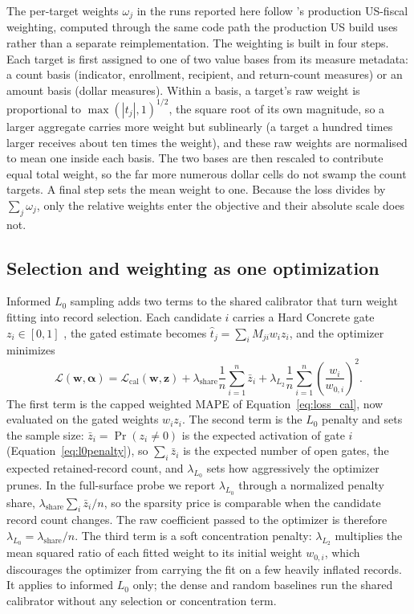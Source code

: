 The per-target weights $\omega_j$ in the runs reported here follow \microcosm{}'s production US-fiscal
weighting, computed through the same code path the production US build uses rather than a separate
reimplementation. The weighting is built in four steps. Each target is first assigned to one of two
value bases from its measure metadata: a count basis (indicator, enrollment, recipient, and
return-count measures) or an amount basis (dollar measures). Within a basis, a target's raw
weight is proportional to $\max(|t_j|, 1)^{1/2}$, the square root of its own magnitude, so a larger
aggregate carries more weight but sublinearly (a target a hundred times larger receives about ten times
the weight), and these raw weights are normalised to mean one inside each basis. The two bases are then
rescaled to contribute equal total weight, so the far more numerous dollar cells do not swamp the count
targets. A final step sets the mean weight to one. Because the loss divides by $\sum_j \omega_j$, only
the relative weights enter the objective and their absolute scale does not.

\subsection{Selection and weighting as one optimization}

Informed $L_0$ sampling adds two terms to the shared calibrator that turn weight fitting into record
selection. Each candidate $i$ carries a Hard Concrete gate $z_i \in [0, 1]$ \citep{louizos2018}, the
gated estimate becomes $\hat{t}_j = \sum_i M_{ji} w_i z_i$, and the optimizer minimizes
\begin{equation}
    \mathcal{L}(\mathbf{w}, \boldsymbol{\alpha}) =
    \mathcal{L}_{\mathrm{cal}}(\mathbf{w}, \mathbf{z}) +
    \lambda_{\mathrm{share}}\frac{1}{n}\sum_{i=1}^{n} \bar{z}_i +
    \lambda_{L_2} \frac{1}{n} \sum_{i=1}^{n} \left(\frac{w_i}{w_{0,i}}\right)^2.
    \label{eq:loss}
\end{equation}
The first term is the capped weighted MAPE of Equation~\ref{eq:loss_cal}, now evaluated on the gated
weights $w_i z_i$. The second term is the $L_0$ penalty and sets the sample size: $\bar{z}_i = \Pr(z_i \neq 0)$ is the
expected activation of gate $i$ (Equation~\ref{eq:l0penalty}), so $\sum_i \bar{z}_i$ is the expected number of open gates, the
expected retained-record count, and $\lambda_{L_0}$ sets how aggressively the optimizer prunes. In the
full-surface probe we report $\lambda_{L_0}$ through a normalized penalty share,
$\lambda_{\mathrm{share}}\sum_i\bar{z}_i/n$, so the sparsity price is comparable when the candidate
record count changes. The raw coefficient passed to the optimizer is therefore
$\lambda_{L_0}=\lambda_{\mathrm{share}}/n$. The third term is a soft concentration penalty: $\lambda_{L_2}$ multiplies the mean squared ratio of each
fitted weight to its initial weight $w_{0,i}$, which discourages the optimizer from carrying the fit on
a few heavily inflated records. It applies to informed $L_0$ only; the dense and random baselines run the
shared calibrator without any selection or concentration term.

